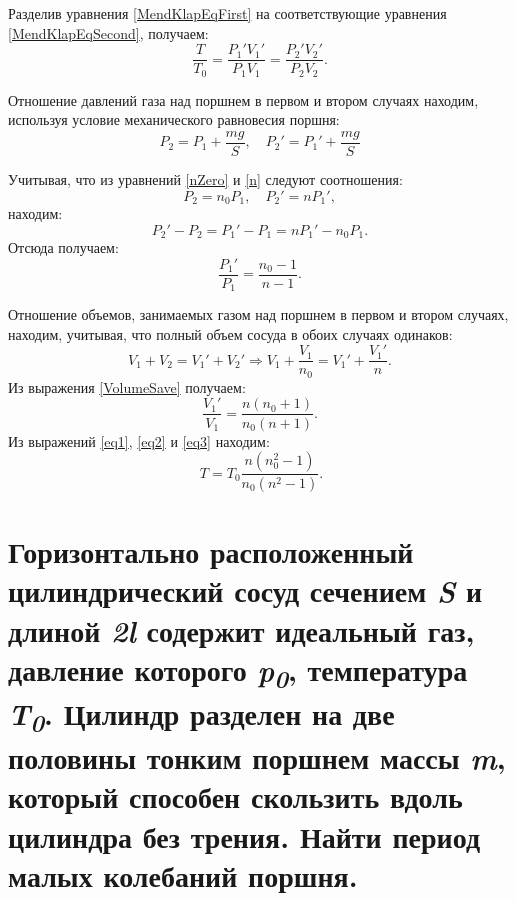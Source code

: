 Разделив уравнения \ref{MendKlapEqFirst} на соответствующие уравнения \ref{MendKlapEqSecond}, получаем:
\begin{equation} \label{eq1}
  \frac{T}{T_0} = \frac{P_1'V_1'}{P_1V_1} = \frac{P_2'V_2'}{P_2V_2}.
\end{equation}

Отношение давлений газа над поршнем в первом и втором случаях находим,
используя условие механического равновесия поршня:
\begin{equation}
  P_2 = P_1 +\frac{mg}{S}, \quad P_2' = P_1' +\frac{mg}{S}
\end{equation}

Учитывая, что из уравнений \ref{nZero} и \ref{n} следуют соотношения:
\begin{equation}
  P_2 = n_0 P_1, \quad P_2' = n P_1',
\end{equation}
находим:
\begin{equation}
  P_2' - P_2 = P_1' - P_1 = nP_1' - n_0P_1.
\end{equation}
Отсюда получаем:
\begin{equation} \label{eq2}
  \frac{P_1'}{P_1} = \frac{n_0-1}{n-1}.
\end{equation}

Отношение объемов, занимаемых газом над поршнем в первом и втором
случаях, находим, учитывая, что полный объем сосуда в обоих случаях
одинаков:
\begin{equation} \label{VolumeSave}
  V_1 +V_2 = V_1' +V_2' \Rightarrow V_1 + \frac{V_1}{n_0} = V_1' + \frac{V_1'}{n}.
\end{equation}
Из выражения \ref{VolumeSave} получаем:
\begin{equation} \label{eq3}
  \frac{V_1'}{V_1} = \frac{n(n_0+1)}{n_0(n+1)}.
\end{equation}
Из выражений \ref{eq1}, \ref{eq2} и \ref{eq3} находим:
\begin{equation} \
  T = T_0\frac{n(n_0^2-1)}{n_0(n^2-1)}.
\end{equation}

\section{Горизонтально расположенный цилиндрический сосуд сечением
\emph{S} и длиной \emph{2l} содержит идеальный газ, давление которого
\emph{p\textsubscript{0}}, температура \emph{T\textsubscript{0}}.
Цилиндр разделен на две половины тонким поршнем массы \emph{m}, который
способен скользить вдоль цилиндра без трения. Найти период малых
колебаний поршня.}

